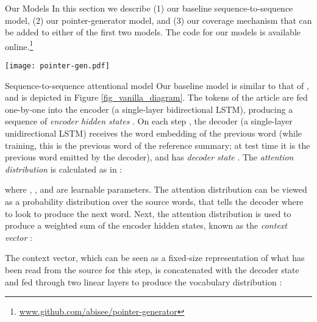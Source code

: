 \documentclass[11pt,a4paper]{article}
\begin{document}
\begin{section}{Our Models}
In this section we describe (1) our baseline sequence-to-sequence model, (2) our pointer-generator model, and (3) our coverage mechanism that can be added to either of the first two models. The code for our models is available online.\footnote{\url{www.github.com/abisee/pointer-generator}}

\begin{figure*}[t]
\centering
\texttt{[image: pointer-gen.pdf]} \caption{Pointer-generator model.
For each decoder timestep a generation probability  is calculated, which weights the probability of \textit{generating} words from the vocabulary, versus \textit{copying} words from the source text.
The vocabulary distribution and the attention distribution are weighted and summed to obtain the final distribution, from which we make our prediction.
Note that out-of-vocabulary article words such as \textit{2-0} are included in the final distribution.
Best viewed in color.
}\label{fig_pg_diagram}
\end{figure*}

\begin{subsection}{Sequence-to-sequence attentional model}
\label{subsec_vanilla}
Our baseline model is similar to that of \citeauthor{nallapati2016abstractive} , and is depicted in Figure \ref{fig_vanilla_diagram}.
The tokens of the article  are fed one-by-one into the encoder (a single-layer bidirectional LSTM), 
producing a sequence of \textit{encoder hidden states} .
On each step , the decoder (a single-layer unidirectional LSTM) receives the word embedding of the previous word (while training, this is the previous word of the reference summary; at test time it is the previous word emitted by the decoder), and has \textit{decoder state} .
The \textit{attention distribution}  is calculated as in \citeauthor{bahdanau2014neural} :

where , ,  and  are learnable parameters.
The attention distribution can be viewed as a probability distribution over the source words, that tells the decoder where to look to produce the next word.
Next, the attention distribution is used to produce a weighted sum of the encoder hidden states, known as the \textit{context vector} :

The context vector, which can be seen as a fixed-size representation of what has been read from the source for this step, is concatenated with the decoder state  and fed through two linear layers to produce the vocabulary distribution :


\end{subsection}
\end{section}
\end{document}
